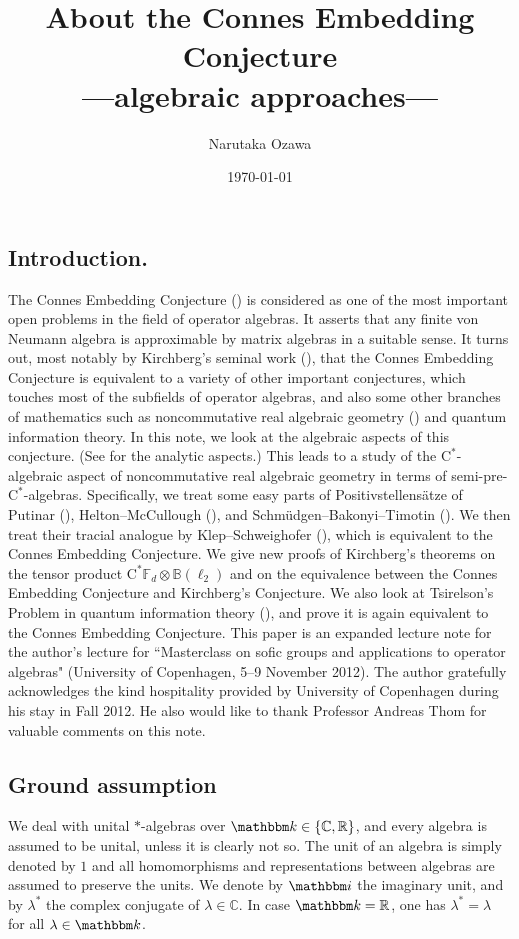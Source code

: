 \documentclass[12pt]{amsart}
\title[About the Connes Embedding Conjecture]{About the Connes Embedding Conjecture\\
\lowercase{---algebraic approaches---}}
\author{Narutaka Ozawa}
\date{\today}
\theoremstyle{definition}
\begin{document}
\maketitle
\subsection{Introduction.}
The Connes Embedding Conjecture (\cite{connes}) is considered as one of the most important
open problems in the field of operator algebras. It asserts that any finite von Neumann
algebra is approximable by matrix algebras in a suitable sense. It turns out, most notably by
Kirchberg's seminal work (\cite{kirchberg}), that the Connes Embedding Conjecture is
equivalent to a variety of other important conjectures, which touches most of the subfields
of operator algebras, and also some other branches of mathematics such as noncommutative real
algebraic geometry (\cite{schmudgen}) and quantum information theory. In this note, we look
at the algebraic aspects of this conjecture. (See \cite{bo,kirchberg,qwep} for the analytic aspects.)
This leads to a study of the $\mathrm{C}^*$-alge\-braic aspect of noncommutative real algebraic
geometry in terms of {semi-pre-$\mathrm{C}^*$-alge\-bra\xspace}{}s.
Specifically, we treat some easy parts of {Positiv\-stellen\-s\"atze\xspace} of Putinar (\cite{putinar}),
Helton--McCullough (\cite{hm}), and Schm\"udgen--Bakonyi--Timotin (\cite{bt}).
We then treat their tracial analogue by Klep--Schweighofer (\cite{ks}),
which is equivalent to the Connes Embedding Conjecture.
We give new proofs of Kirchberg's theorems on the tensor product
$\mathrm{C}^*{{\mathbb F}}_d\otimes{{\mathbb B}}(\ell_2)$ and on the equivalence between
the Connes Embedding Conjecture and Kirchberg's Conjecture.
We also look at Tsirelson's Problem in quantum information theory
(\cite{fritz,jungeetal,tsirelson}), and prove it is again equivalent to the Connes Embedding Conjecture.
This paper is an expanded lecture note for the author's lecture for ``Masterclass on sofic groups
and applications to operator algebras" (University of Copenhagen, 5--9 November 2012).
The author gratefully acknowledges the kind hospitality provided by
University of Copenhagen during his stay in Fall 2012.
He also would like to thank Professor Andreas Thom for
valuable comments on this note.

\subsection{Ground assumption}
We deal with unital $*$-algebras over ${{\mathbbm k}}\in\{{{\mathbb C}},{{\mathbb R}}\}$, and
every algebra is assumed to be unital, unless it is clearly not so.
The unit of an algebra is simply denoted by $1$ and all homomorphisms
and representations between algebras are assumed to preserve the units.
We denote by ${{\mathbbm i}}$ the imaginary unit, and by $\lambda^*$ the complex conjugate
of $\lambda\in{{\mathbb C}}$.
In case ${{\mathbbm k}}={{\mathbb R}}$, one has $\lambda^*=\lambda$ for all $\lambda\in{{\mathbbm k}}$.
\end{document}
